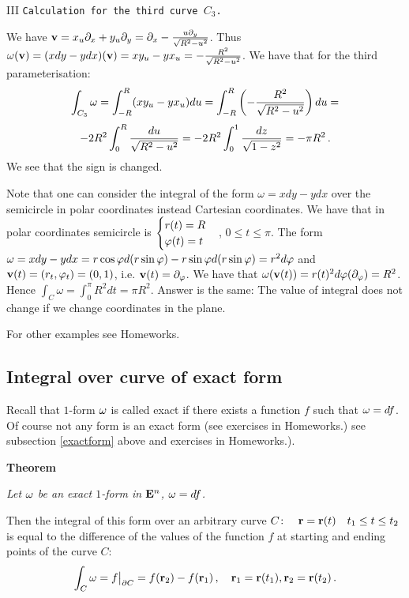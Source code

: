 \documentclass[12pt]{article}
\numberwithin{equation}{section}
\begin{document}
III {\tt Calculation for the third curve $C_3$.}
 
  We have ${\bf v}=x_u\partial_x+y_u\partial_y= \partial_x-{u\partial_y\over \sqrt {R^2-u^2}}$. Thus
  ${\omega}({\bf v})=(xdy-ydx)({\bf v})=xy_u-yx_u=-{R^2\over \sqrt {R^2-u^2}}$. We have
 that for the third parameterisation:
           $$
     \int_{C_3} {\omega}=\int_{-R}^{R}(xy_u-yx_u)du=
\int_{-R}^{R}\left(-{R^2\over \sqrt {R^2-u^2}}\right)du=
           $$
         $$
         -2R^2
         \int_0^{R} {du\over \sqrt {R^2-u^2}}=
-2R^2\int_0^{1} {dz\over \sqrt {1-z^2}}=-\pi R^2\,.
         $$
We see that the sign is changed.

{\footnotesize Note that one can 
consider the integral of the form $\omega=xdy-ydx$ over the semicircle
in polar coordinates instead Cartesian coordinates.
We have that in polar coordinates semicircle is
$\begin{cases} r(t)=R\cr \varphi (t)=t\end {cases}$,
$0\leq t\leq \pi$.  The form
${\omega}=xdy-ydx=r\cos\varphi d(r\sin \varphi)-r\sin\varphi d(r\sin \varphi)=r^2d\varphi$
and ${\bf v}(t)=(r_t,\varphi_t)=(0,1)$, i.e. ${\bf v}(t)=\partial_\varphi$. We have that ${\omega}({\bf v}(t))=
r(t)^2d\varphi(\partial_\varphi)=R^2$. Hence
             $
             \int_C \omega=\int_0^{\pi}R^2dt=\pi R^2$.
Answer is the same: The value of integral does not change if we change coordinates in the plane.
}

\smallskip

For other examples see Homeworks.




\subsection {Integral over curve of exact form}


Recall that $1$-form ${\omega}$ is called exact if there 
exists a function $f$ such that ${\omega}=df$.
 Of course not any form is an exact form 
(see exercises in Homeworks.)
see subsection \ref{exactform} 
above and exercises in Homeworks.).




\bigskip

{\bf Theorem}

{\it Let ${\omega}$ be an exact $1$-form in ${\bf E}^n$, ${\omega}=df$.

Then the integral of this form over an arbitrary curve   
$C\colon\quad {\bf r}={\bf r}(t)\quad t_1\leq t\leq t_2$
     is equal to the difference of the values of the function $f$ at starting and ending points
     of the curve $C$:
             \begin{equation}\label{theorem1}
    \int_C {\omega}=f\big\vert_{\partial C}=f({\bf r}_2)-f({\bf r}_1)\,, \quad {\bf r}_1={\bf r}(t_1),{\bf r}_2={\bf r}(t_2)\,.
\end{equation}
}
\end{document}
